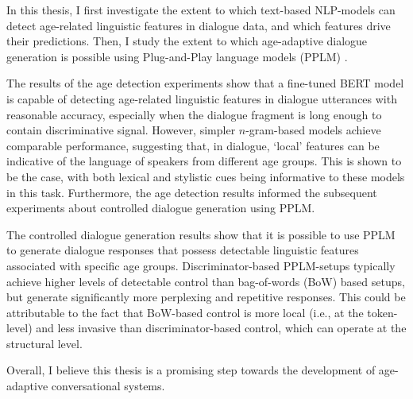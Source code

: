 
In this thesis, I first investigate the extent to which text-based NLP-models can detect age-related linguistic features in dialogue data, and which features drive their predictions. Then, I study the extent to which age-adaptive dialogue generation is possible using Plug-and-Play language models (PPLM) \citep{dathathri2019plug}.

The results of the age detection experiments show that a fine-tuned BERT model is capable of detecting age-related linguistic features in dialogue utterances with reasonable accuracy, especially when the dialogue fragment is long enough to contain discriminative signal. However, simpler $n$-gram-based models achieve comparable performance, suggesting that, in dialogue, ‘local’ features can be indicative of the language of speakers from different age groups. This is shown to be the case, with both lexical and stylistic cues being informative to these models in this task. Furthermore, the age detection results informed the subsequent experiments about controlled dialogue generation using PPLM.

The controlled dialogue generation results show that it is possible to use PPLM to generate dialogue responses that possess detectable linguistic features associated with specific age groups. Discriminator-based PPLM-setups typically achieve higher levels of detectable control 
than bag-of-words (BoW) based setups, but generate significantly more perplexing and repetitive responses. This could be attributable to the fact that BoW-based control is more local (i.e., at the token-level) and less invasive than discriminator-based control, which can operate at the structural level. 

Overall, I believe this thesis is a promising step towards the development of age-adaptive conversational systems.